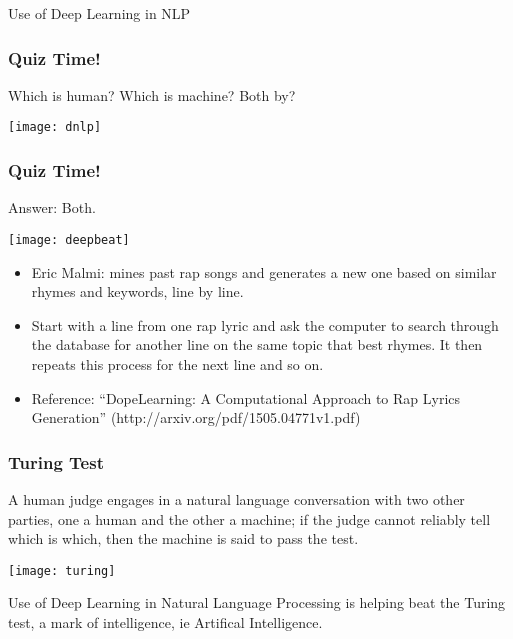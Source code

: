 \begin{frame}
  \begin{center}
    {\Large Use of Deep Learning in NLP}
  \end{center}
\end{frame}


\begin{frame}[fragile]\frametitle{Quiz Time!}
Which is human? Which is machine? Both by?
\begin{center}
\texttt{[image: dnlp]}

\end{center}
\end{frame}

\begin{frame}[fragile]\frametitle{Quiz Time!}
Answer: Both.
\begin{center}
\texttt{[image: deepbeat]}

	\begin{itemize}
	\item Eric Malmi: mines past rap songs and generates a new one based on similar rhymes and keywords, line by line.
	\item Start with a line from one rap lyric and ask the computer to search through the database for another line on the same topic that best rhymes. It then repeats this process for the next line and so on.
	\item Reference: ``DopeLearning: A Computational Approach to Rap Lyrics Generation'' (http://arxiv.org/pdf/1505.04771v1.pdf)
	\end{itemize}
\end{center}
\end{frame}


\begin{frame}[fragile]\frametitle{Turing Test}

A human judge engages in a natural language conversation with two other parties, one a human and the other a machine; if the judge cannot reliably tell which is which, then the machine is said to pass the test. 

\begin{center}
\texttt{[image: turing]}
\end{center}

Use of Deep Learning in Natural Language Processing is helping beat the Turing test, a mark of intelligence, ie Artifical Intelligence.
\end{frame}

